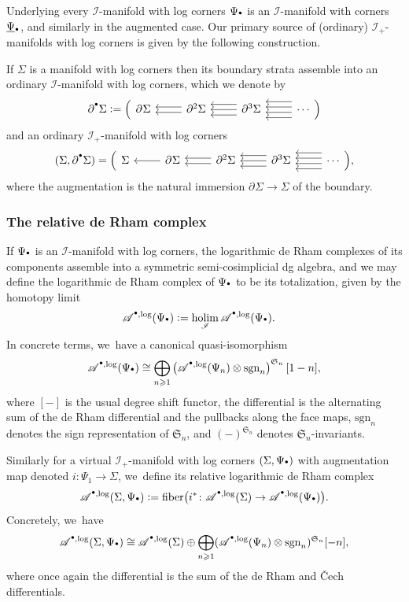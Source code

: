 \documentclass[10pt]{amsart}
\let\oldbullet\bullet
\renewcommand{\bullet}{{\raisebox{1pt}{$\scriptscriptstyle\oldbullet$}}}
\newcommand{\rbirac}[1]{\bigl(#1\bigr)}
\newcommand{\rBrac}[1]{\Bigl(#1\Bigr)}
\theoremstyle{definition}
\theoremstyle{remark}
\newenvironment{example}
  {\pushQED{\qed}\renewcommand{\qedsymbol}{$\lozenge$}\examplex}
  {\popQED\endexamplex}
\renewcommand{\ge}{\geqslant}
\newcommand{\defas}{\mathrel{\mathop:}=}
\newcommand{\rbrac}[1]{\left(#1\right)}
\newcommand{\Alog}[2][\bullet]{\mathscr{A}^{#1,\log}(#2)}
\newcommand{\Sig}{\Sigma}
\newcommand{\bdSig}[1][]{\partial^{#1}\Sigma}
\newcommand{\symgp}[1]{\mathfrak{S}_{#1}}
\newcommand{\sgn}[1]{\mathrm{sgn}_{#1}}
\newcommand{\simp}[3]
{
\begin{tikzcd}[ampersand replacement=\&]
     {#1} \& {#2} \ar[l,shift left = 1]\ar[l,shift right=1] \& {#3} \ar[l,shift left = 2]\ar[l,shift left = 0]\ar[l,shift left = -2] \& \ar[l,shift left = 3]\ar[l,shift left = 1]\ar[l,shift left = -1]\ar[l,shift left = -3] \cdots
    \end{tikzcd}
}
\newcommand{\augsimp}[4]
{
\begin{tikzcd}[ampersand replacement=\&]
     #1 \& #2 \ar[l] \& #3
     \ar[l,shift left = 1]\ar[l,shift right=1] \& #4 \ar[l,shift left = 2]\ar[l,shift left = 0]\ar[l,shift left = -2] \& \ar[l,shift left = 3]\ar[l,shift left = 1]\ar[l,shift left = -1]\ar[l,shift left = -3] \cdots
    \end{tikzcd}
}
\newcommand{\scat}{\mathscr{I}}
\newcommand{\ascat}{\mathscr{I}_+}
\DeclareMathOperator*{\holim}{holim}
\DeclareMathOperator*{\fibre}{fiber}
\begin{document}
Underlying every $\scat$-manifold with log corners $\Psi_\bullet$ is an $\scat$-manifold with corners $\underline{\Psi}_\bullet$, and similarly in the augmented case. Our primary source of (ordinary) $\ascat$-manifolds with log corners is given by the following construction.

\begin{example}
If $\Sig$ is a manifold with log corners then its boundary strata assemble into an ordinary $\scat$-manifold with log corners, which we denote by\vspace*{-3pt}
\[
\bdSig[\bullet] \defas \rBrac{\simp{\bdSig}{\bdSig[2]}{\bdSig[3]}}
\]
and an ordinary $\ascat$-manifold with log corners\vspace*{-3pt}
\[
(\Sig,\bdSig[\bullet]) = \rBrac{\augsimp{\Sig}{\bdSig}{\bdSig[2]}{\bdSig[3]}},
\]
where the augmentation is the natural immersion $\bdSig \to \Sig$ of the boundary.
\end{example}

\subsubsection{The relative de Rham complex}\label{sec:relative-de-Rham}
If $\Psi_\bullet$ is an $\scat$-manifold with log corners, the logarithmic de Rham complexes of its components assemble into a symmetric semi-cosimplicial dg algebra, and we may define the logarithmic de Rham complex of $\Psi_\bullet$ to be its totalization, given by the homotopy limit
\begin{align*}
\Alog{\Psi_\bullet} &\defas \holim_{\scat} \Alog{\Psi_\bullet}.
\end{align*}
In concrete terms, we~have a canonical quasi-isomorphism
\[
\Alog{\Psi_\bullet} \cong \bigoplus_{n \ge 1} \rbrac{\Alog{\Psi_n} \otimes \sgn{n}}^{\symgp{n}}[1-n],
\]
where $[-]$ is the usual degree shift functor, the differential is the alternating sum of the de Rham differential and the pullbacks along the face maps, $\sgn{n}$ denotes the sign representation of $\symgp{n}$, and $(-)^{\symgp{n}}$ denotes $\symgp{n}$-invariants.

Similarly for a virtual $\ascat$-manifold with log corners $(\Sig,\Psi_\bullet)$ with augmentation map denoted $i \colon \Psi_1 \to \Sig$, we~define its relative logarithmic de Rham complex
\[
\Alog{\Sig,\Psi_\bullet} \defas \fibre\rbirac{i^*\colon \Alog{\Sig} \to \Alog{\Psi_\bullet}}.
\]
Concretely, we~have
\[
\Alog{\Sig,\Psi_\bullet} \cong \Alog{\Sig} \oplus \bigoplus_{n \ge 1}(\Alog{\Psi_n} \otimes \sgn{n})^{\symgp{n}}[-n],
\]
where once again the differential is the sum of the de Rham and \v{C}ech differentials.
\end{document}
